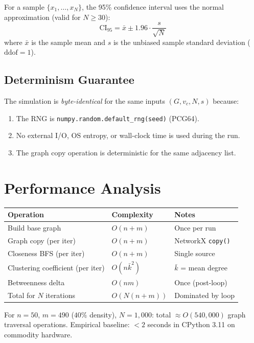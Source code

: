 \documentclass[12pt, a4paper]{article}
\begin{document}
For a sample $\{x_1, \ldots, x_N\}$, the 95\% confidence interval uses the
normal approximation (valid for $N \geq 30$):
\[
  \text{CI}_{95} = \bar{x} \pm 1.96 \cdot \frac{s}{\sqrt{N}}
\]
where $\bar{x}$ is the sample mean and $s$ is the unbiased sample standard
deviation ($\text{ddof}=1$).

\subsection{Determinism Guarantee}

The simulation is \emph{byte-identical} for the same inputs $(G, v_c, N, s)$
because:
\begin{enumerate}
  \item The RNG is \texttt{numpy.random.default\_rng(seed)} (PCG64).
  \item No external I/O, OS entropy, or wall-clock time is used during the run.
  \item The graph copy operation is deterministic for the same adjacency list.
\end{enumerate}

\section{Performance Analysis}

\begin{center}
\begin{tabular}{lll}
\toprule
Operation & Complexity & Notes \\
\midrule
Build base graph & $O(n + m)$ & Once per run \\
Graph copy (per iter) & $O(n + m)$ & NetworkX \texttt{copy()} \\
Closeness BFS (per iter) & $O(n + m)$ & Single source \\
Clustering coefficient (per iter) & $O(n \bar{k}^2)$ & $\bar{k}$ = mean degree \\
Betweenness delta & $O(nm)$ & Once (post-loop) \\
Total for $N$ iterations & $O(N(n+m))$ & Dominated by loop \\
\bottomrule
\end{tabular}
\end{center}

For $n=50$, $m=490$ ($40\%$ density), $N=1{,}000$:
total $\approx O(540{,}000)$ graph traversal operations.
Empirical baseline: $< 2$ seconds in CPython 3.11 on commodity hardware.
\end{document}

